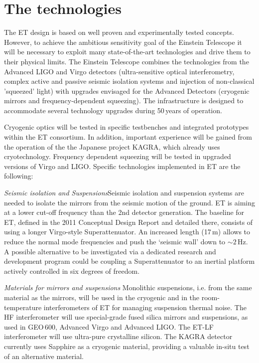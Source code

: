 \section*{The technologies}

The ET design is based on well proven and experimentally tested concepts. However, to achieve the ambitious sensitivity goal of the Einstein Telescope
it will be necessary to exploit many state-of-the-art technologies and drive
them to their physical limits. The Einstein Telescope combines the %
technologies from the Advanced LIGO and Virgo detectors (ultra-sensitive optical interferometry, complex active and passive seismic isolation systems and injection of non-classical 'squeezed' light)  with upgrades envisaged for the Advanced Detectors (cryogenic mirrors and frequency-dependent squeezing). 
The infrastructure is designed to accommodate several technology upgrades during 50\,years of operation.

Cryogenic optics will be tested in specific testbenches and integrated prototypes within the ET consortium. In addition, important experience will be gained from the operation of the the Japanese project KAGRA, which already uses cryotechnology. Frequency dependent squeezing will be tested in upgraded versions of Virgo and LIGO.  Specific technologies implemented in ET are the
following: 


\textit{Seismic isolation and Suspensions}\quad Seismic isolation and suspension
systems are needed to isolate the mirrors from the seismic motion of the ground.
ET is aiming at a lower cut-off frequency than the 2nd detector generation. The
baseline for ET, defined in the 2011 Conceptual Design Report and detailed
there, consists of using a longer Virgo-style Superattenuator. An increased
length (17\,m) allows to reduce the normal mode frequencies and push the `seismic
wall' down to $\sim 2$\,Hz. A possible alternative to be investigated via a dedicated research and development program could be coupling a Superattenuator to an inertial platform actively controlled in six degrees of freedom.

\textit{Materials for mirrors and suspensions}\quad
Monolithic suspensions, i.e. from the same material as the mirrors, will be used in the cryogenic and in the room-temperature interferometers of ET for managing suspension thermal noise.
The HF interferometer will use special-grade fused silica mirrors and suspensions, as used in GEO\,600, Advanced Virgo and Advanced LIGO. The ET-LF interferometer will use ultra-pure crystalline silicon. The KAGRA detector currently uses Sapphire as a cryogenic material, providing a valuable in-situ test of an alternative material.


